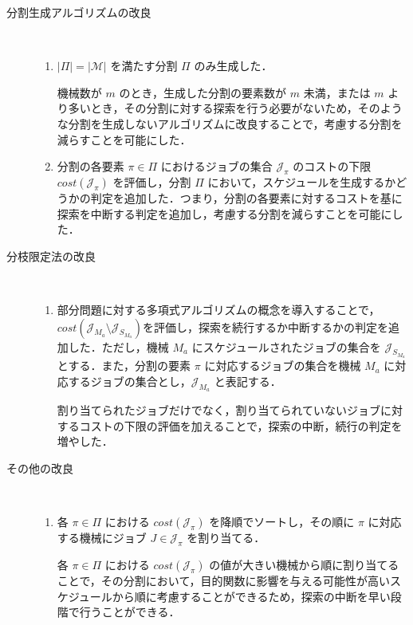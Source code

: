 \documentclass[12pt]{optlab-bachelor}
\begin{document}
\begin{description}
  \item[分割生成アルゴリズムの改良] ~
  \begin{enumerate}
    \setlength{\leftskip}{-10mm}
    \item $|\Pi| = |\mathcal{M}|$ を満たす分割 $\Pi$ のみ生成した．

    機械数が $m$ のとき，生成した分割の要素数が $m$ 未満，または $m$ より多いとき，その分割に対する探索を行う必要がないため，そのような分割を生成しないアルゴリズムに改良することで，考慮する分割を減らすことを可能にした．

    \item 分割の各要素 $\pi \in \Pi$ におけるジョブの集合 $\mathcal{J}_{\pi}$ のコストの下限 $cost(\mathcal{J}_{\pi})$ を評価し，分割 $\Pi$ において，スケジュールを生成するかどうかの判定を追加した．つまり，分割の各要素に対するコストを基に探索を中断する判定を追加し，考慮する分割を減らすことを可能にした．
  \end{enumerate}

  \item[分枝限定法の改良] ~
  \begin{enumerate}
    \setlength{\leftskip}{-10mm}
    \item 部分問題に対する多項式アルゴリズムの概念を導入することで，$cost(\mathcal{J}_{M_a} \setminus \mathcal{J}_{S_{M_a}})$を評価し，探索を続行するか中断するかの判定を追加した．ただし，機械 $M_a$ にスケジュールされたジョブの集合を $\mathcal{J}_{S_{M_a}}$ とする．また，分割の要素 $\pi$ に対応するジョブの集合を機械 $M_a$ に対応するジョブの集合とし，$\mathcal{J}_{M_a}$ と表記する．

    割り当てられたジョブだけでなく，割り当てられていないジョブに対するコストの下限の評価を加えることで，探索の中断，続行の判定を増やした．
  \end{enumerate}

  \item[その他の改良] ~
  \begin{enumerate}
    \setlength{\leftskip}{-10mm}
    \item 各 $\pi \in \Pi$ における $cost(\mathcal{J}_{\pi})$ を降順でソートし，その順に $\pi$ に対応する機械にジョブ $J \in \mathcal{J}_{\pi}$ を割り当てる．

    各 $\pi \in \Pi$ における $cost(\mathcal{J}_{\pi})$ の値が大きい機械から順に割り当てることで，その分割において，目的関数に影響を与える可能性が高いスケジュールから順に考慮することができるため，探索の中断を早い段階で行うことができる．
  \end{enumerate}
\end{description}
\end{document}
